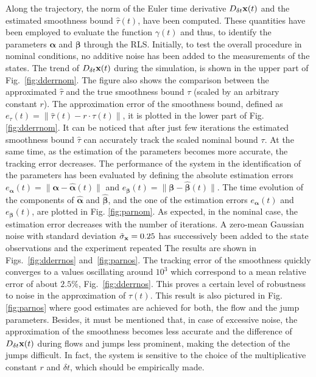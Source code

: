 Along the trajectory, the norm of the Euler time derivative $D_{\delta t}\mathbf{x}(t)$ and the estimated smoothness bound $\hat{\tau}(t)$, have been computed. These quantities have been employed to evaluate the function $\gamma(t)$ and thus, to identify the parameters $\bm{\alpha}$ and $\bm{\beta}$ through the RLS. Initially, to test the overall procedure in nominal conditions, no additive noise has been added to the measurements of the states.
The trend of $D_{\delta t}\mathbf{x}(t)$ during the simulation, is shown in the upper part of Fig.~\ref{fig:dderrnom}. The figure also shows the comparison between the approximated $\hat{\tau}$ and the true smoothness bound $\tau$ (scaled by an arbitrary constant $r$). The approximation error of the smoothness bound, defined as $e_{\tau}(t)=\|\hat{\tau}(t)-r\cdot\tau(t)\|$, it is plotted in the lower part of Fig. \ref{fig:dderrnom}. 
It can be noticed that after just few iterations the estimated smoothness bound $\hat{\tau}$ can accurately track the scaled nominal bound $\tau$. At the same time, as the estimation of the parameters becomes more accurate,  the tracking error decreases. 
The performance of the system in the identification of the parameters has been evaluated by defining the absolute estimation errors
$e_{\bm{\alpha}}(t)=\|\bm{\alpha}-\hat{\bm{\alpha}}(t)\|$ and $e_{\bm{\beta}}(t)=\|\bm{\beta}-\hat{\bm{\beta}}(t)\|$.
%
The time evolution of the components of $\hat{\bm{\alpha}}$ and $\hat{\bm{\beta}}$, and the one of the estimation errors $e_{\bm{\alpha}}(t)$ and $e_{\bm{\beta}}(t)$, are plotted in Fig. \ref{fig:parnom}.
%
As expected, in the nominal case, the estimation error decreases with the number of iterations. 
A zero-mean Gaussian noise with standard deviation $\tilde{\sigma}_{\mathbf{x}}=0.25$ has successively been added to the state observations and the experiment repeated %
The results are shown in Figs.~\ref{fig:dderrnos} and~\ref{fig:parnos}.
%
%
 The tracking error of the smoothness quickly converges to a values oscillating around $10^3$ which correspond to a mean relative error of about $2.5\%$, Fig.~\ref{fig:dderrnos}. This proves a certain level of robustness to noise in the approximation of $\tau(t)$. This result is also pictured in Fig. \ref{fig:parnos} where good estimates are achieved for both, the flow and the jump parameters. Besides, it must be mentioned that, in case of excessive noise, the approximation of the smoothness becomes less accurate and the difference of $D_{\delta t}\mathbf{x}(t)$ during flows and jumps less prominent, making the detection of the jumps difficult. In fact, the system is sensitive to the choice of the multiplicative constant $r$ and $\delta t$, which should be empirically made. 
